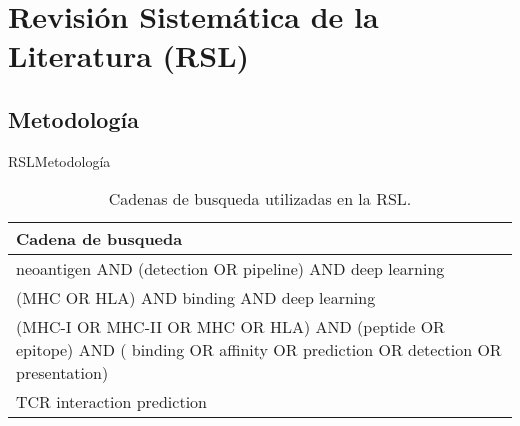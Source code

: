 \documentclass[10pt]{beamer}
\newcommand{\1}{
	\setbeamertemplate{background}{
		\texttt{[image: img/1]}
		\tikz[overlay] \fill[fill opacity=0.75,fill=white] (0,0) rectangle (-\paperwidth,\paperheight);
	}
}
\begin{document}
\section{Revisión Sistemática de la Literatura (RSL)}

\subsection{Metodología}


\begin{frame}{RSL}{Metodología}

	\begin{table}[H]
		\begin{center}
			\caption{Cadenas de busqueda utilizadas en la RSL.}
			\label{tab:key_words}
			\setlength{\tabcolsep}{0.5em} %
			{\renewcommand{\arraystretch}{1.4}%
				\begin{tabular}{p{10cm}}
					\textbf{Cadena de busqueda} \\ \hline
					neoantigen  AND (detection OR pipeline) AND deep learning                                                                               \\
					(MHC OR HLA) AND binding  AND deep learning                                                                                             \\				
					(MHC-I OR MHC-II OR MHC OR HLA) AND (peptide OR epitope) AND ( binding OR affinity OR prediction OR detection OR presentation)          \\
					TCR interaction prediction                                                                                                              \\		
				\end{tabular}
			}
		\end{center}
	\end{table}
\end{frame}
\end{document}
